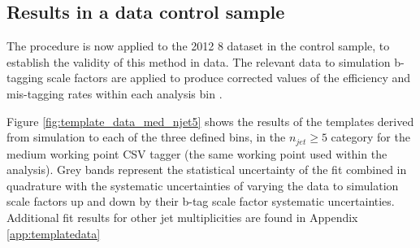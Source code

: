 \FloatBarrier
\subsection{Results in a data control sample}
\label{subsec:templatedataresults}

The procedure is now applied to the 2012 8 \TeV dataset in the \mupjets control sample, to establish the validity of this method in data. The relevant data to simulation b-tagging scale factors are applied to produce corrected values of the efficiency and mis-tagging rates within each analysis bin \cite{btagscalefactor}. 

Figure \ref{fig:template_data_med_njet5} shows the results of the templates derived from simulation to each of the three defined \theht bins, in the $n_{jet} \geq 5$ category for the medium working point \ac{CSV} tagger (the same working point used within the \alphat analysis).  Grey bands represent the statistical uncertainty of the fit combined in quadrature with the systematic uncertainties of varying the data to simulation scale factors up and down by their b-tag scale factor systematic uncertainties.  Additional fit results for other jet multiplicities are found in Appendix \ref{app:templatedata}  

